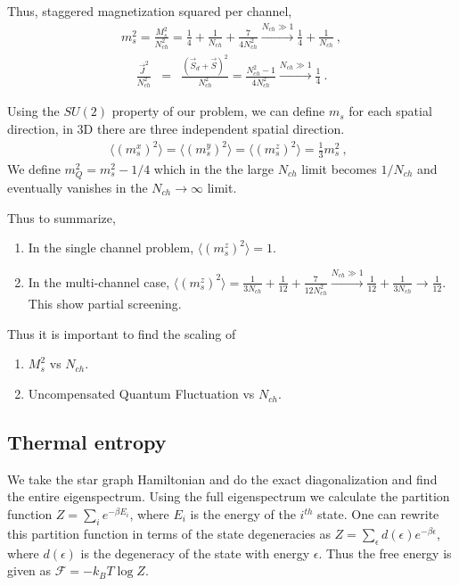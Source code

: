 \documentclass[reprint,prb,superscriptaddress]{revtex4-2}
\begin{document}
\noindent Thus, staggered magnetization squared per channel,
\begin{eqnarray}
m_s^2=\frac{M_s^2}{N_{ch}^2}=\frac{1}{4}+\frac{1}{N_{ch}}+\frac{7}{4N_{ch}^2} \xrightarrow[]{N_{ch}\gg 1} \frac{1}{4}+\frac{1}{N_{ch}}~,
\end{eqnarray}
\begin{eqnarray}
\frac{\vec{J}^2}{N_{ch}^2}&=&\frac{(\vec{S}_d+\vec{S})^2}{N_{ch}^2}= \frac{N^2_{ch}-1}{4N^2_{ch}} \xrightarrow[]{N_{ch}\gg 1} \frac{1}{4}~. \nonumber 
\end{eqnarray}

Using the $SU(2)$ property of our problem, we can define $m_s$ for each spatial direction, in 3D there are three independent spatial direction.
\begin{eqnarray}
\langle(m_s^x)^2\rangle=\langle(m_s^y)^2\rangle=\langle(m_s^z)^2\rangle=\frac{1}{3}m_s^2~,~~   
\end{eqnarray}
We define $m_Q^2=m_s^2-1/4$ which in the the large $N_{ch}$ limit becomes $1/N_{ch}$ and eventually vanishes in the $N_{ch}\rightarrow \infty$ limit. 


\noindent Thus to summarize,
\begin{enumerate}
\item In the single channel problem, $\langle (m_s^z)^2 \rangle=1$. 
\item In the multi-channel case,  
$\langle (m_s^z)^2 \rangle=\frac{1}{3N_{ch}}+\frac{1}{12}+\frac{7}{12N_{ch}^2} \xrightarrow[]{N_{ch}\gg 1} \frac{1}{12}+\frac{1}{3N_{ch}}\rightarrow \frac{1}{12}$. 
This show partial screening.
\end{enumerate}

Thus it is important to find the scaling of 

\begin{enumerate}
\item $M_s^2$ vs $N_{ch}$.
\item Uncompensated Quantum Fluctuation vs $N_{ch}$.
\end{enumerate}

\subsection{Thermal entropy}
We take the star graph Hamiltonian and do the exact diagonalization and find the entire eigenspectrum. Using the full eigenspectrum we calculate the partition function $Z=\sum_i e^{-\beta E_i}$, where $E_i$ is the energy of the $i^{th}$ state. One can rewrite this partition function in terms of the state degeneracies as $Z=\sum_{\epsilon} d(\epsilon) e^{-\beta \epsilon} $, where $d(\epsilon)$ is the degeneracy of the state with energy $\epsilon$. Thus the free energy is given as $\mathcal{F}=-k_BT\log Z$. 
\end{document}
